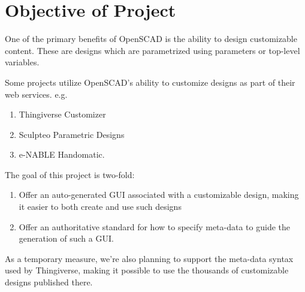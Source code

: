 \section{Objective of Project}

One of the primary benefits of OpenSCAD is the ability to design customizable content. These are designs which are parametrized using parameters or top-level variables.


Some projects utilize OpenSCAD's ability to customize designs as part of their web services.
e.g.
\begin{enumerate}
    \item Thingiverse Customizer
    \item  Sculpteo Parametric Designs
    \item e-NABLE Handomatic.
\end{enumerate}


The goal of this project is two-fold:
\begin{enumerate}
    \item  Offer an auto-generated GUI associated with a customizable design, making it easier to both create and use such designs
    \item Offer an authoritative standard for how to specify meta-data to guide the generation of such a GUI.
   
\end{enumerate}

As a temporary measure, we're also planning to support the meta-data syntax used by Thingiverse, making it possible to use the thousands of customizable designs published there.


%  
%  


